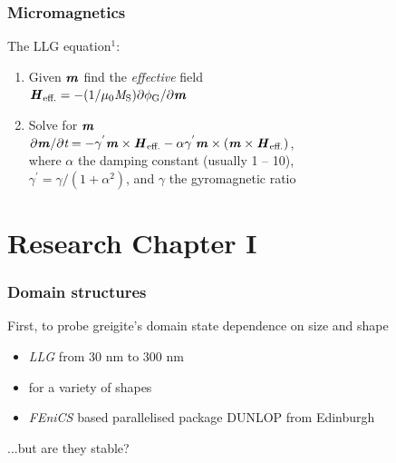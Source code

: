 \documentclass{beamer}
\begin{document}
        \begin{frame}
          \frametitle{Micromagnetics}
          \color{ImperialNavy}\huge{The LLG equation$^{\text{1}}$:}
          \begin{enumerate}
            \item Given $\textbf{\textit{m}}$ find the \alert{\textit{effective}} field\\
            $\textbf{\textit{H}}_{\text{eff.}}=-(\text{1}/\mu_{\text{0}}\textit{M}_{\text{S}})\partial\phi_{\text{G}}/\partial\textbf{\textit{m}}$
            \item Solve for $\textbf{\textit{m}}$\\
            $\partial\textbf{\textit{m}}/\partial\textit{t} = -\gamma^{'}\textbf{\textit{m}}\times\textbf{\textit{H}}_{\text{eff.}} - \alpha\gamma^{'}\textbf{\textit{m}}\times(\textbf{\textit{m}}\times\textbf{\textit{H}}_{\text{eff.}})$, \\
            \vspace{2mm} where $\alpha$ \alert{the damping constant} (usually 1 -- 10),\\
            $\gamma^{'}=\gamma/(\text{1}+\alpha^{\text{2}})$, and $\gamma$ \alert{the gyromagnetic ratio}
          \end{enumerate}
        \end{frame}

        \section{Research Chapter I}
        \begin{frame}
          \frametitle{Domain structures}
          First, to probe greigite's domain state dependence on size and shape
          \begin{itemize}
            \item \color{ImperialNavy}\textit{LLG }from \alert{30 nm to 300 nm}
            \item for a variety of \alert{shapes}
            \item \textit{FEniCS} based parallelised package \alert{DUNLOP} from Edinburgh
          \end{itemize}
          \color{ImperialProcessBlue}\Large{...but are they stable?}
        \end{frame}
\end{document}
